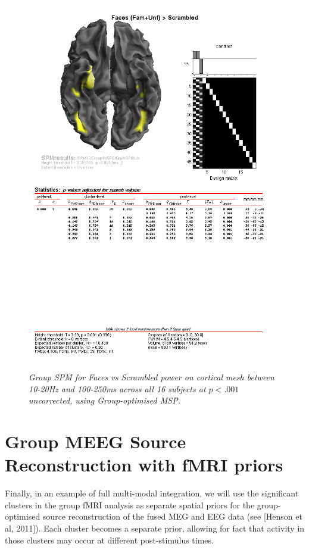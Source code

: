 \begin{figure}
\begin{center}
\includegraphics[width=150mm]{multi/figures/figure15}
\caption{\em Group SPM for Faces vs Scrambled power on cortical mesh between 10-20Hz and 100-250ms  across all 16 subjects at \(p<.001\)uncorrected, using Group-optimised MSP. \label{multi:fig:15}}
\end{center}
\end{figure}

\section{Group MEEG Source Reconstruction with fMRI priors}

Finally, in an example of full multi-modal integration, we will use the significant clusters in the group fMRI analysis as separate spatial priors for the group-optimised source reconstruction of the fused MEG and EEG data (see [Henson et al, 2011]). Each cluster becomes a separate prior, allowing for fact that activity in those clusters may occur at different post-stimulus times.


